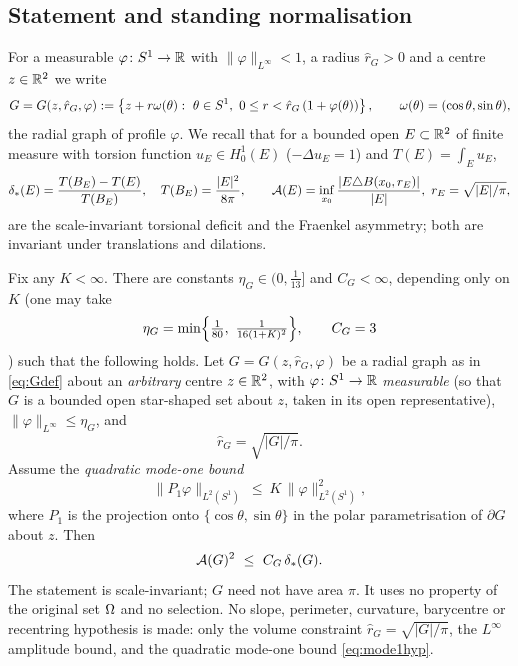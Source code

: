 \subsection{Statement and standing normalisation}

For a measurable $\varphi\colon S^1\to\mathbb{R}$ with $\|\varphi\|_{L^\infty}<1$, a
radius $\hat r_G>0$ and a centre $z\in\mathbb{R}^2$ we write
\begin{equation}\label{eq:Gdef}
   G=G(z,\hat r_G,\varphi):=\left\{z+r\omega(\theta):\ \theta\in S^1,\
   0\le r<\hat r_G\,(1+\varphi(\theta))\right\},\qquad \omega(\theta)=(\cos\theta,\sin\theta),
\end{equation}
the radial graph of profile $\varphi$. We recall that for a bounded open
$E\subset\mathbb{R}^2$ of finite measure with torsion function $u_E\in H^1_0(E)$
($-\Delta u_E=1$) and $T(E)=\int_E u_E$,
\begin{equation}\label{eq:dstarAdef}
   \dstar(E)=\frac{T(B_E)-T(E)}{T(B_E)},\quad T(B_E)=\frac{|E|^2}{8\pi},
   \qquad
   \AF(E)=\inf_{x_0}\frac{|E\triangle B(x_0,r_E)|}{|E|},\ r_E=\sqrt{|E|/\pi},
\end{equation}
are the scale-invariant torsional deficit and the Fraenkel asymmetry; both
are invariant under translations and dilations.

\begin{theorem}\label{thm:graphG}
Fix any $K<\infty$. There are constants $\eta_G\in(0,\tfrac1{13}]$ and
$C_G<\infty$, depending only on $K$ \textup{(}one may take
\begin{equation}\label{eq:graphG-const}
   \eta_G=\min\Bigl\{\tfrac1{80},\ \tfrac1{16(1+K)^2}\Bigr\},
   \qquad C_G=3
\end{equation}
\textup{)} such that the following holds. Let $G=G(z,\hat r_G,\varphi)$ be a
radial graph as in \eqref{eq:Gdef} about an \emph{arbitrary} centre
$z\in\mathbb{R}^2$, with $\varphi\colon S^1\to\mathbb{R}$ \emph{measurable} \textup{(}so that
$G$ is a bounded open star-shaped set about $z$, taken in its open
representative\textup{)},
$\|\varphi\|_{L^\infty}\le\eta_G$, and
\[
   \hat r_G=\sqrt{|G|/\pi}.
\]
Assume the \emph{quadratic mode-one bound}
\begin{equation}\label{eq:mode1hyp}
   \|P_1\varphi\|_{L^2(S^1)}\ \le\ K\,\|\varphi\|_{L^2(S^1)}^2,
\end{equation}
where $P_1$ is the projection onto $\{\cos\theta,\sin\theta\}$ in the polar
parametrisation of $\partial G$ about $z$. Then
\begin{equation}\label{eq:graphG}
   \mathcal{A}(G)^2\ \le\ C_G\,\delta_{*}(G).
\end{equation}
The statement is scale-invariant; $G$ need not have area $\pi$. It uses no
property of the original set $\Omega$ and no selection. No slope, perimeter,
curvature, barycentre or recentring hypothesis is made: only the volume
constraint $\hat r_G=\sqrt{|G|/\pi}$, the $L^\infty$ amplitude bound, and the
quadratic mode-one bound \eqref{eq:mode1hyp}.
\end{theorem}

